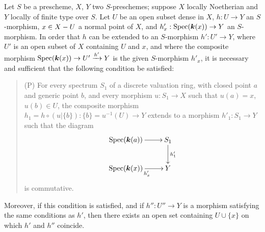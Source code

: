 \begin{proposition}[20.4.6]
\label{IV.20.4.6}
Let $S$ be a prescheme, $X$, $Y$ two $S$-preschemes; suppose $X$ locally Noetherian and $Y$ locally of finite type over $S$.
Let $U$ be an open subset dense in $X$, $h:U\to Y$ an $S$-morphism, $x\in X- U$ a \textup{normal} point of $X$, and $h'_x:\operatorname{Spec}(\boldsymbol{k}(x))\to Y$ an $S$-morphism.
In order that $h$ can be extended to an $S$-morphism $h':U'\to Y$, where $U'$ is an open subset of $X$ containing $U$ and $x$, and where the composite morphism $\operatorname{Spec}(\boldsymbol{k}(x))\to U'\xrightarrow{h'}Y$ is the given $S$-morphism $h'_x$, it is necessary and sufficient that the following condition be satisfied:
\begin{quote}
\textup{(P)} For every spectrum $S_1$ of a discrete valuation ring, with closed point $a$ and generic point $b$, and every morphism $u:S_1\to X$ such that $u(a)=x$, $u(b)\in U$, the composite morphism $h_1=h\circ(u|\{b\}):\{b\}=u^{-1}(U)\to Y$ extends to a morphism $h'_1:S_1\to Y$ such that the diagram
\[
  \xymatrix{
  \Spec(\boldsymbol{k}(a)) \ar[r] & S_1 \ar[d]^{h'_1} \\
  \Spec(\boldsymbol{k}(x)) \ar[r]_{h'_x} & Y
  }
\]
is commutative.
\end{quote}
Moreover, if this condition is satisfied, and if $h'':U''\to Y$ is a morphism satisfying the same conditions as $h'$, then there exists an open set containing $U\cup\{x\}$ on which $h'$ and $h''$ coincide.
\end{proposition}

